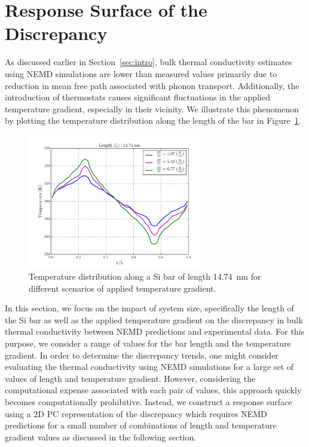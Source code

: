 \section{Response Surface of the Discrepancy}
\label{sec:response}

As discussed earlier in Section~\ref{sec:intro}, bulk thermal conductivity estimates using NEMD simulations
are lower than measured values primarily due to reduction in mean free path associated with phonon transport. 
Additionally, the introduction of thermostats causes significant fluctuations in the applied temperature gradient,
especially in their vicinity. 
We illustrate this phenomenon by plotting the temperature 
distribution along the length of the bar in Figure~\ref{fig:kapitza}. 

\begin{figure}[htbp]
 \begin{center}
  \includegraphics[width=0.70\textwidth]{./Figures/temp_plot}
\caption{Temperature distribution along a Si bar of length 14.74~nm for
different scenarios of applied temperature gradient.}
\label{fig:kapitza}
\end{center}
\end{figure}

In this section, we focus on the impact of
system size, specifically the length of the Si bar as well as the applied temperature gradient on the discrepancy
in bulk thermal conductivity between NEMD predictions and experimental data. For this purpose, we consider
a range of values for the bar length and the temperature gradient. In order to determine the discrepancy trends, one
might consider evaluating the thermal conductivity using NEMD simulations for a large set of values of length and
temperature gradient. However, considering the computational expense associated with each pair of values, this approach quickly
becomes computationally prohibitive. Instead, we construct a response surface using a 2D 
PC representation of the discrepancy which requires NEMD predictions for a small number of
combinations of length and temperature gradient values as discussed in the following section. 

